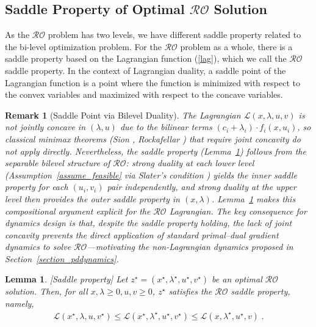 \documentclass[journal,twoside,web]{ieeecolor}
\newcommand{\rev}[1]{\textcolor{revisionblue}{#1}}
\newtheorem{lemma}{Lemma}
\newtheorem{remark}{Remark}
\begin{document}
\subsection*{Saddle Property of Optimal $\mathcal{RO}$ Solution}

As the $\mathcal{RO}$ problem has two levels, we have different saddle property related to the bi-level optimization problem. For the $\mathcal{RO}$ problem as a whole, there is a saddle property based on the Lagrangian function (\ref{lag}), which we call the $\mathcal{RO}$ saddle property. In the context of Lagrangian duality, a saddle point of the Lagrangian function is a point where the function is minimized with respect to the convex variables and maximized with respect to the concave variables.

\begin{remark}[\rev{Saddle Point via Bilevel Duality}]
\rev{The Lagrangian $\mathcal{L}(x,\lambda,u,v)$ is not jointly concave
in $(\lambda,u)$ due to the bilinear terms
$(c_i+\lambda_i)\cdot f_i(x,u_i)$, so classical minimax theorems
(Sion \cite{sion1958}, Rockafellar \cite{rockafellar1970}) that
require joint concavity do not apply directly.  Nevertheless, the
saddle property (Lemma~\ref{saddle.lem}) follows from the separable
bilevel structure of $\mathcal{RO}$: strong duality at each lower
level (Assumption~\ref{assume_feasible} via Slater's condition
\cite[Section~5.2.3]{boyd2004}) yields the inner saddle property for
each $(u_i, v_i)$ pair independently, and strong duality at the upper
level then provides the outer saddle property in
$(x,\lambda)$.  Lemma~\ref{saddle.lem} makes this compositional
argument explicit for the $\mathcal{RO}$ Lagrangian.  The key
consequence for dynamics design is that, despite the saddle property
holding, the lack of joint concavity prevents the direct application
of standard primal--dual gradient dynamics
\cite{arrow1958,feijer2010,cherukuri2016} to solve
$\mathcal{RO}$---motivating the non-Lagrangian dynamics proposed in
Section~\ref{section_pddynamics}.}
\end{remark}

\begin{lemma} \label{saddle.lem} [Saddle property]
Let $z^\star=(x^\star,\lambda^\star,u^\star,v^\star)$ be an optimal $\mathcal{RO}$ solution. Then, for all $x,\lambda\geq 0,u,v\geq 0$\;, $z^\star$ satisfies the $\mathcal{RO}$ saddle property, namely,
\begin{align} \label{saddle}
\mathcal{L}(x^\star,\lambda,u,v^\star)\leq \mathcal{L}(x^\star,\lambda^\star,u^\star,v^\star)\leq \mathcal{L}(x,\lambda^\star,u^\star,v)\;.
\end{align}
\end{lemma}
\end{document}
